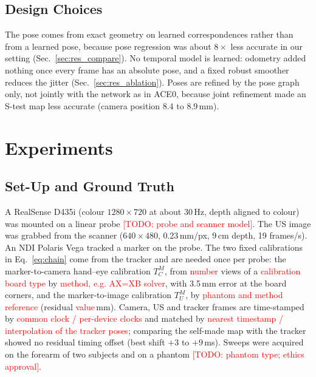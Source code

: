 \documentclass[9pt,shortpaper,twoside,web]{ieeecolor2}
\newcommand{\tbd}[1]{\textcolor{red}{[TODO: #1]}}
\newcommand{\Stest}{S-test}
\begin{document}
\subsection{Design Choices}
\label{sec:design}
The pose comes from exact geometry on learned correspondences rather than from a learned pose, because pose regression was about $8\times$ less accurate in our setting (Sec.~\ref{sec:res_compare}). No temporal model is learned: odometry added nothing once every frame has an absolute pose, and a fixed robust smoother reduces the jitter (Sec.~\ref{sec:res_ablation}). Poses are refined by the pose graph only, not jointly with the network as in ACE0, because joint refinement made an \Stest{} map less accurate (camera position 8.4 to 8.9\,mm).




\section{Experiments}
\label{sec:experiments}

\subsection{Set-Up and Ground Truth}
\label{sec:data}\label{sec:implementation}\label{sec:groundtruth}\label{sec:sensorcal}
A RealSense D435i (colour $1280\times720$ at about 30\,Hz, depth aligned to colour) was mounted on a linear probe \tbd{probe and scanner model}. The US image was grabbed from the scanner ($640\times480$, 0.23\,mm/px, 9\,cm depth, 19 frames/s). An NDI Polaris Vega tracked a marker on the probe. The two fixed calibrations in Eq.~\eqref{eq:chain} come from the tracker and are needed once per probe: the marker-to-camera hand--eye calibration $T^M_C$, from \textcolor{red}{number} views of a \textcolor{red}{calibration board type} by \textcolor{red}{method, e.g. AX=XB solver}, with 3.5\,mm error at the board corners, and the marker-to-image calibration $T^M_U$, by \textcolor{red}{phantom and method} \textcolor{red}{reference} (residual \textcolor{red}{value}\,mm). Camera, US and tracker frames are time-stamped by \textcolor{red}{common clock / per-device clocks} and matched by \textcolor{red}{nearest timestamp / interpolation of the tracker poses}; comparing the self-made map with the tracker showed no residual timing offset (best shift $+3$ to $+9$\,ms). Sweeps were acquired on the forearm of two subjects and on a phantom \tbd{phantom type; ethics approval}.
\end{document}
